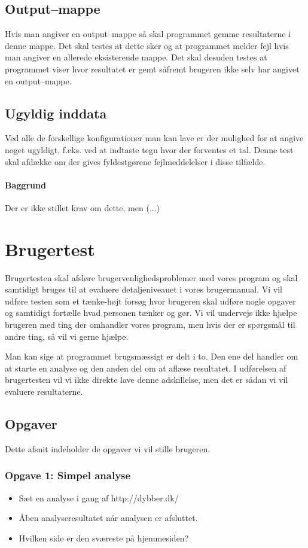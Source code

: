 \documentclass[a4paper,oneside,article]{memoir}
\begin{document}
\section{Output--mappe}
Hvis man angiver en output--mappe så skal programmet gemme
resultaterne i denne mappe. Det skal testes at dette sker og at
programmet melder fejl hvis man angiver en allerede eksisterende
mappe. Det skal desuden testes at programmet viser hvor resultatet er
gemt såfremt brugeren ikke selv har angivet en output--mappe.

\section{Ugyldig inddata}
Ved alle de forskellige konfigurationer man kan lave er der mulighed
for at angive noget ugyldigt, f.eks. ved at indtaste tegn hvor der
forventes et tal. Denne test skal afdække om der gives fyldestgørene
fejlmeddelelser i disse tilfælde.



\subsubsection{Baggrund}
Der er ikke stillet krav om dette, men (...)

\chapter{Brugertest}
Brugertesten skal afsløre brugervenlighedsproblemer med vores program
og skal samtidigt bruges til at evaluere detaljeniveauet i vores
brugermanual. Vi vil udføre testen som et tænke-højt forsøg hvor
brugeren skal udføre nogle opgaver og samtidigt fortælle hvad personen
tænker og gør. Vi vil undervejs ikke hjælpe brugeren med ting der
omhandler vores program, men hvis der er spørgsmål til andre ting, så
vil vi gerne hjælpe.

Man kan sige at programmet brugsmæssigt er delt i to. Den ene del
handler om at starte en analyse og den anden del om at aflæse
resultatet. I udførelsen af brugertesten vil vi ikke direkte lave
denne adskillelse, men det er sådan vi vil evaluere resultaterne.
\newpage
\section{Opgaver}
Dette afsnit indeholder de opgaver vi vil stille brugeren.

\subsection{Opgave 1: Simpel analyse}
\begin{itemize}
\item Sæt en analyse i gang af http://dybber.dk/
\item Åben analyseresultatet når analysen er afsluttet.
\item Hvilken side er den sværeste på hjemmesiden?
\end{itemize}
\end{document}
